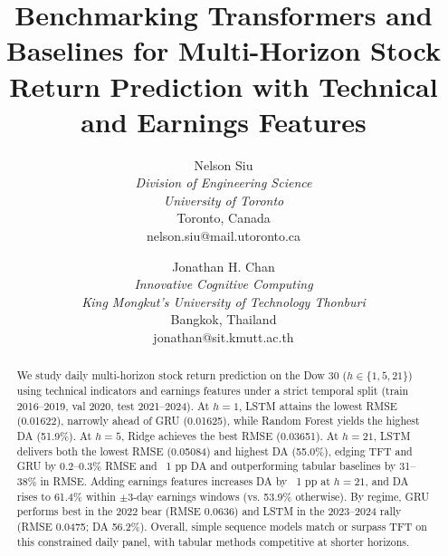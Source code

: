 \documentclass[conference,a4paper]{IEEEtran}
\begin{document}
\title{Benchmarking Transformers and Baselines for Multi-Horizon Stock Return Prediction with Technical and Earnings Features}


\author{Nelson Siu \\
\textit{Division of Engineering Science} \\
\textit{University of Toronto} \\
Toronto, Canada\\
nelson.siu@mail.utoronto.ca

\and
Jonathan H. Chan \\
\textit{Innovative Cognitive Computing} \\
\textit{King Mongkut's University of Technology Thonburi} \\
Bangkok, Thailand\\
jonathan@sit.kmutt.ac.th}


\date{}

\maketitle

\begin{abstract}
We study daily multi-horizon stock return prediction on the Dow 30 ($h \in \{1,5,21\}$) using technical indicators and earnings features under a strict temporal split (train 2016--2019, val 2020, test 2021--2024). At $h{=}1$, LSTM attains the lowest RMSE (0.01622), narrowly ahead of GRU (0.01625), while Random Forest yields the highest DA (51.9\%). At $h{=}5$, Ridge achieves the best RMSE (0.03651). At $h{=}21$, LSTM delivers both the lowest RMSE (0.05084) and highest DA (55.0\%), edging TFT and GRU by 0.2--0.3\% RMSE and ~1 pp DA and outperforming tabular baselines by 31--38\% in RMSE. Adding earnings features increases DA by ~1 pp at $h{=}21$, and DA rises to 61.4\% within $\pm 3$-day earnings windows (vs. 53.9\% otherwise). By regime, GRU performs best in the 2022 bear (RMSE 0.0636) and LSTM in the 2023--2024 rally (RMSE 0.0475; DA 56.2\%). Overall, simple sequence models match or surpass TFT on this constrained daily panel, with tabular methods competitive at shorter horizons.
\end{abstract}
\end{document}
